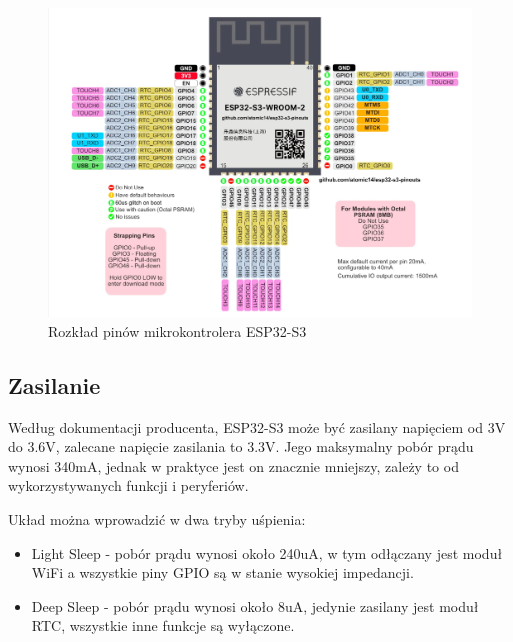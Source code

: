 \documentclass[../main.tex]{subfiles}
\begin{document}
\begin{figure}[H]
  \centering
  \includegraphics[width=1\textwidth]{Esp32.png}
  \caption{Rozkład pinów mikrokontrolera ESP32-S3\cite{st:esp32-pin}}
\end{figure}

\subsection{Zasilanie}
Według dokumentacji producenta, ESP32-S3 może być zasilany napięciem od 3V do 3.6V, zalecane napięcie zasilania to 3.3V.
Jego maksymalny pobór prądu wynosi 340mA, jednak w praktyce jest on znacznie mniejszy, zależy to od wykorzystywanych funkcji i peryferiów.

Układ można wprowadzić w dwa tryby uśpienia:
\begin{itemize}
\item Light Sleep - pobór prądu wynosi około 240uA, w tym odłączany jest moduł WiFi a wszystkie piny GPIO są w stanie wysokiej impedancji.
\item Deep Sleep - pobór prądu wynosi około 8uA, jedynie zasilany jest moduł RTC, wszystkie inne funkcje są wyłączone.
\end{itemize}
\end{document}
